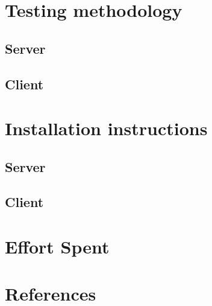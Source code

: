 \chapter{Testing methodology}
	\section{Server}
		
	\section{Client}
		
\newpage
\chapter{Installation instructions}
	\section{Server}
		
	\section{Client}
		
\newpage
\chapter{Effort Spent}
    
\chapter{References}
	


